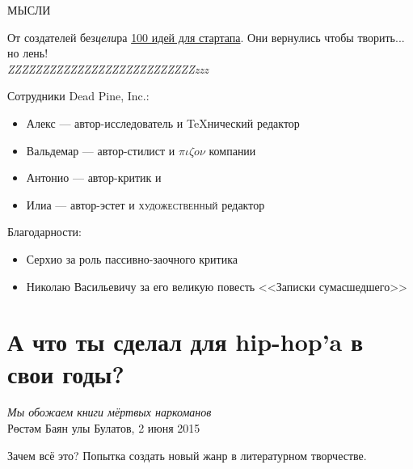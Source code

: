 \documentclass{ideas}
\renewcommand{\author}{Dead Pine, Inc.}
\begin{document}
\begin{titlepage}

\vspace*{\fill}
\begin{center}
\Huge МЫСЛИ
\end{center}
\vspace*{\fill}
\end{titlepage}

    От создателей без\emph{цели}ра \href{https://antoniii.github.io/}{100 идей для стартапа}.
    Они вернулись чтобы творить... но лень!\\

    \emph{\Huge{ZZZ}\LARGE{ZZZ}\Large{ZZZ}\large{ZZZ}ZZZ\small{ZZZ}\footnotesize{ZZZ}\scriptsize{ZZZ}\tiny{ZZZ}\tiny{zzz}}
\newpage


\vspace*{\fill}
\begin{center}
Сотрудники \author:
  \begin{itemize}
    \item Алекс ---  автор-исследователь и {\TeX}нический редактор
    \item Вальдемар --- автор-стилист и \( \pi\iota\zeta o \nu \) компании
    \item Антонио --- автор-критик и 
    \item Илиа --- автор-эстет и {\selectfont\scshape художественный} редактор
  \end{itemize}

\vfill
Благодарности:
  \begin{itemize}
    \item Серхио за роль пассивно-заочного критика
    \item Николаю Васильевичу за его великую повесть <<Записки сумасшедшего>>
  \end{itemize}
\end{center}
\vfill
\newpage
\section*{А что ты сделал для hip-hop'a в свои годы?}\label{section:one}
\begin{displayquote}
\begin{flushright}
    \emph{Мы обожаем книги мёртвых наркоманов}\\
    Рөстәм Баян улы Булатов, 2 июня 2015
\end{flushright}
\end{displayquote}
Зачем всё это? Попытка создать новый жанр в литературном творчестве.
\end{document}
